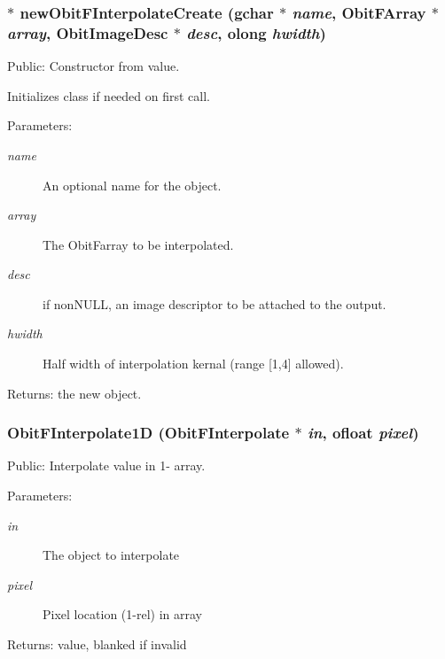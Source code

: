 \subsubsection{$\ast$ new\-Obit\-FInterpolate\-Create (gchar $\ast$ {\em name}, {\bf Obit\-FArray} $\ast$ {\em array}, {\bf Obit\-Image\-Desc} $\ast$ {\em desc}, {\bf olong} {\em hwidth})}\label{ObitFInterpolate_8c_a8}


Public: Constructor from value. 

Initializes class if needed on first call. \begin{Desc}
\item[Parameters:]
\begin{description}
\item[{\em name}]An optional name for the object. \item[{\em array}]The Obit\-Farray to be interpolated. \item[{\em desc}]if non\-NULL, an image descriptor to be attached to the output. \item[{\em hwidth}]Half width of interpolation kernal (range [1,4] allowed). \end{description}
\end{Desc}
\begin{Desc}
\item[Returns:]the new object. \end{Desc}
\subsubsection{ Obit\-FInterpolate1D ({\bf Obit\-FInterpolate} $\ast$ {\em in}, {\bf ofloat} {\em pixel})}\label{ObitFInterpolate_8c_a14}


Public: Interpolate value in 1- array. 

\begin{Desc}
\item[Parameters:]
\begin{description}
\item[{\em in}]The object to interpolate \item[{\em pixel}]Pixel location (1-rel) in array \end{description}
\end{Desc}
\begin{Desc}
\item[Returns:]value, blanked if invalid \end{Desc}
